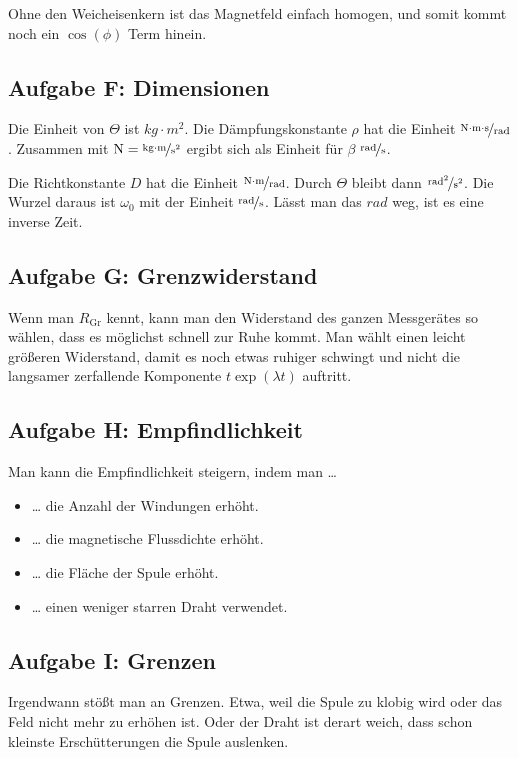 \documentclass[11pt, ngerman]{article}
\begin{document}
Ohne den Weicheisenkern ist das Magnetfeld einfach homogen, und somit kommt
noch ein $\cos(\phi)$ Term hinein.

\subsection{Aufgabe F: Dimensionen}

Die Einheit von $\Theta$ ist $\unit{kg \cdot m^2}$. Die Dämpfungskonstante
$\rho$ hat die Einheit $\unitfrac{N \cdot m \cdot s}{rad}$. Zusammen mit
$\unit{N} = \unitfrac{kg \cdot m}{s^2}$ ergibt sich als Einheit für $\beta$
$\unitfrac{rad}s$.

Die Richtkonstante $D$ hat die Einheit $\unitfrac{N \cdot m}{rad}$. Durch
$\Theta$ bleibt dann $\unitfrac{rad^2}{s^2}$. Die Wurzel daraus ist $\omega_0$
mit der Einheit $\unitfrac{rad}{s}$. Lässt man das $\unit{rad}$ weg, ist es
eine inverse Zeit.

\subsection{Aufgabe G: Grenzwiderstand}

Wenn man $R_\text{Gr}$ kennt, kann man den Widerstand des ganzen Messgerätes so
wählen, dass es möglichst schnell zur Ruhe kommt. Man wählt einen leicht
größeren Widerstand, damit es noch etwas ruhiger schwingt und nicht die
langsamer zerfallende Komponente $t \exp(\lambda t)$ auftritt.

\subsection{Aufgabe H: Empfindlichkeit}

Man kann die Empfindlichkeit steigern, indem man …

\begin{itemize}
	\item … die Anzahl der Windungen erhöht.
	\item … die magnetische Flussdichte erhöht.
	\item … die Fläche der Spule erhöht.
	\item … einen weniger starren Draht verwendet.
\end{itemize}

\subsection{Aufgabe I: Grenzen}

Irgendwann stößt man an Grenzen. Etwa, weil die Spule zu klobig wird oder das
Feld nicht mehr zu erhöhen ist. Oder der Draht ist derart weich, dass schon
kleinste Erschütterungen die Spule auslenken.
\end{document}
